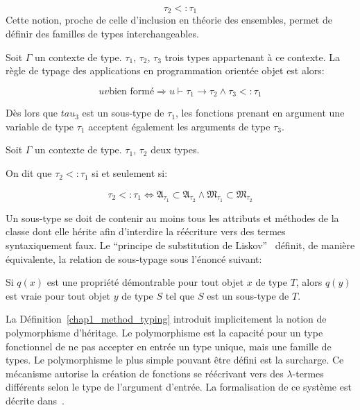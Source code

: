 \begin{equation}
  \tau_2 <: \tau_1
\end{equation}
%
%
Cette notion, proche de celle d'inclusion en théorie des ensembles,
permet de définir des familles de types interchangeables.
%
%
\begin{mydef}\label{chap1_oo_app}
  Soit $\Gamma$ un contexte de type. $\tau_1$, $\tau_2$, $\tau_3$
  trois types appartenant à ce contexte. La règle de typage des
  applications en programmation orientée objet est alors:


  \begin{equation}
    u v \text{bien formé} \Rightarrow u \vdash \tau_1 \rightarrow
    \tau_2 \wedge \tau_3 <: \tau_1
  \end{equation}

  Dès lors que $tau_3$ est un sous-type de $\tau_1$, les fonctions
  prenant en argument une variable de type $\tau_1$ acceptent
  également les arguments de type $\tau_3$.
\end{mydef}
%
\begin{mydef}\label{chap1_method_typing}
  Soit $\Gamma$ un contexte de type. $\tau_1$, $\tau_2$ deux types.

  On dit que $\tau_2 <: \tau_1$ si et seulement si:

  \begin{equation}
    \tau_2 <: \tau_1 \Leftrightarrow \mathfrak{A_{\tau_1}} \subset
    \mathfrak{A_{\tau_2}} \wedge \mathfrak{M_{\tau_1}} \subset
    \mathfrak{M_{\tau_2}}
  \end{equation}
\end{mydef}
%
Un sous-type se doit de contenir au moins tous les attributs et
méthodes de la classe dont elle hérite afin d'interdire la réécriture
vers des termes syntaxiquement faux. Le ``principe de substitution de
Liskov'' \citep{Liskov94familyvalues} définit, de manière équivalente,
la relation de sous-typage sous l'énoncé suivant:
%
\begin{mydef}\label{chap1_liskov}
  Si $q(x)$ est une propriété démontrable pour tout objet $x$ de type
  $T$, alors $q(y)$ est vraie pour tout objet $y$ de type $S$ tel que
  $S$ est un sous-type de $T$.
\end{mydef}


La Définition \ref{chap1_method_typing} introduit implicitement la
notion de polymorphisme d'héritage. Le polymorphisme est la capacité
pour un type fonctionnel de ne pas accepter en entrée un type unique,
mais une famille de types. Le polymorphisme le plus simple pouvant
être défini est la surcharge. Ce mécanisme autorise
la création de fonctions se réécrivant vers des $\lambda$-termes
différents selon le type de l'argument d'entrée. La formalisation de
ce système est décrite dans \citep{Castagna95acalculus}.

